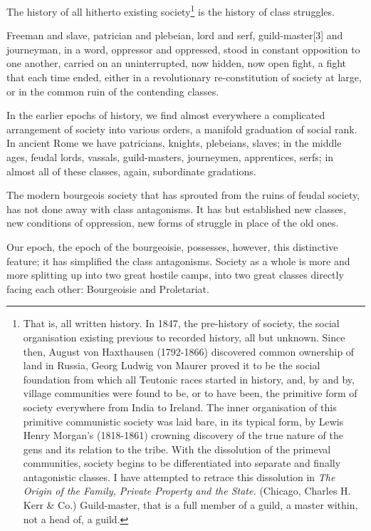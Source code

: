 The history of all hitherto existing society\footnote{That is, all written history. In 1847, the pre-history of society, the social organisation existing previous to recorded history, all but unknown. Since then, August von Haxthausen (1792-1866) discovered common ownership of land in Russia, Georg Ludwig von Maurer proved it to be the social foundation from which all Teutonic races started in history, and, by and by, village communities were found to be, or to have been, the primitive form of society everywhere from India to Ireland. The inner organisation of this primitive communistic society was laid bare, in its typical form, by Lewis Henry Morgan's (1818-1861) crowning discovery of the true nature of the gens and its relation to the tribe. With the dissolution of the primeval communities, society begins to be differentiated into separate and finally antagonistic classes. I have attempted to retrace this dissolution in \emph{The Origin of the Family, Private Property and the State.} (Chicago, Charles H. Kerr \& Co.)
 Guild-master, that is a full member of a guild, a master within, not a head of, a guild.} is the history of class struggles.

Freeman and slave, patrician and plebeian, lord and serf, guild-master[3] and journeyman, in a word, oppressor and oppressed, stood in constant opposition to one another, carried on an uninterrupted, now hidden, now open fight, a fight that each time ended, either in a revolutionary re-constitution of society at large, or in the common ruin of the contending classes.

In the earlier epochs of history, we find almost everywhere a complicated arrangement of society into various orders, a manifold graduation of social rank. In ancient Rome we have patricians, knights, plebeians, slaves; in the middle ages, feudal lords, vassals, guild-masters, journeymen, apprentices, serfs; in almost all of these classes, again, subordinate gradations.

The modern bourgeois society that has sprouted from the ruins of feudal society, has not done away with class antagonisms. It has but established new classes, new conditions of oppression, new forms of struggle in place of the old ones.

Our epoch, the epoch of the bourgeoisie, possesses, however, this distinctive feature; it has simplified the class antagonisms. Society as a whole is more and more splitting up into two great hostile camps, into two great classes directly facing each other: Bourgeoisie and Proletariat.

